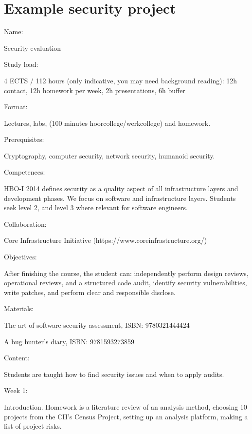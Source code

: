\section*{Example security project}

Name:

Security evaluation\\\mbox{}

Study load:

4 ECTS / 112 hours (only indicative, you may need background reading): 12h contact, 12h homework per week, 2h presentations, 6h buffer\\\mbox{}

Format:

Lectures, labs, (100 minutes hoorcollege/werkcollege) and homework.\\\mbox{}

Prerequisites:

Cryptography, computer security, network security, humanoid security.\\\mbox{}

Competences:

HBO-I 2014 defines security as a quality aspect of all infrastructure layers and development phases. We focus on software and infrastructure layers. Students seek level 2, and level 3 where relevant for software engineers.\\\mbox{}

Collaboration:

Core Infrastructure Initiative (https://www.coreinfrastructure.org/)\\\mbox{}

Objectives:

After finishing the course, the student can: independently perform design reviews, operational reviews, and a structured code audit, identify security vulnerabilities, write patches, and perform clear and responsible disclose.\\\mbox{}

Materials:

The art of software security assessment, ISBN: 9780321444424

A bug hunter’s diary, ISBN: 9781593273859\\\mbox{}

Content:

Students are taught how to find security issues and when to apply audits.\\\mbox{}

Week 1:

Introduction. Homework is a literature review of an analysis 	method, choosing 10 projects from the CII’s Census Project, setting up an analysis platform, making a list of project risks.\\\mbox{}

